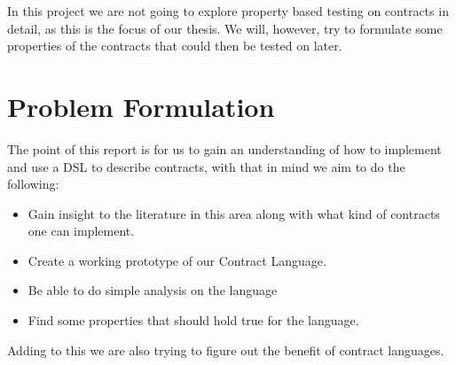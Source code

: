 \documentclass{ituthesis}
\begin{document}
In this project we are not going to explore property based testing on contracts in detail, as this is the focus of our thesis. We will, however, try to formulate some properties of the contracts that could then be tested on later.

\section{Problem Formulation}
The point of this report is for us to gain an understanding of how to implement and use a DSL to describe contracts, with that in mind we aim to do the following:

\begin{itemize}
    \item Gain insight to the literature in this area along with what kind of contracts one can implement.
    \item Create a working prototype of our Contract Language.
    \item Be able to do simple analysis on the language
    \item Find some properties that should hold true for the language.
\end{itemize}

Adding to this we are also trying to figure out the benefit of contract languages.

\end{document}
